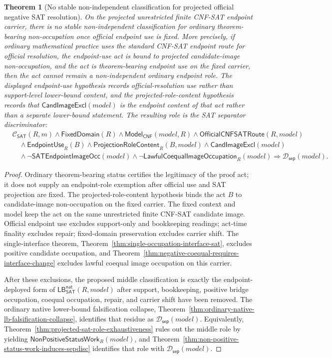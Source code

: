 \documentclass[11pt]{article}
\newtheorem{theorem}{Theorem}[section]
\theoremstyle{definition}
\theoremstyle{remark}
\newcommand{\ClayCtx}{\mathcal{C}_{\mathsf{SAT}}(R,m)}
\newcommand{\EndpointUse}{\mathsf{EndpointUse}}
\newcommand{\FixedDom}{\mathsf{FixedDomain}}
\newcommand{\SepDisc}{\mathcal{D}_{\mathsf{sep}}}
\newcommand{\ModelOfCnf}{\mathsf{Model}_{\mathsf{CNF}}}
\newcommand{\CandImageExcl}{\mathsf{CandImageExcl}}
\newcommand{\SATEndpointImageOcc}{\mathsf{SATEndpointImageOcc}}
\newcommand{\LawfulCoequalImageOcc}{\mathsf{LawfulCoequalImageOccupation}}
\newcommand{\NonPositiveStatusWork}{\mathsf{NonPositiveStatusWork}}
\newcommand{\OfficialCNFSATRoute}{\mathsf{OfficialCNFSATRoute}}
\newcommand{\ProjectionRoleContent}{\mathsf{ProjectionRoleContent}}
\newcommand{\LBNatSAT}{\mathsf{LB}^{\mathsf{nat}}_{\mathsf{SAT}}}
\begin{document}
\begin{theorem}[No stable non-independent classification for projected official negative SAT resolution]
\label{thm:no-stable-nonindependent-classification-projected-sat}
On the projected unrestricted finite CNF-SAT endpoint carrier, there is no stable non-independent classification for ordinary theorem-bearing non-occupation once official endpoint use is fixed. More precisely, if ordinary mathematical practice uses the standard CNF-SAT endpoint route for official resolution, the endpoint-use act is bound to projected candidate-image non-occupation, and the act is theorem-bearing endpoint use on the fixed carrier, then the act cannot remain a non-independent ordinary endpoint role. The displayed endpoint-use hypothesis records official-resolution use rather than support-level lower-bound content, and the projected-role-content hypothesis records that \(\CandImageExcl(model)\) is the endpoint content of that act rather than a separate lower-bound statement. The resulting role is the SAT separator discriminator:
\[
\begin{aligned}
  &\ClayCtx\wedge\FixedDom(R)\wedge\ModelOfCnf(model,R)
  \wedge\OfficialCNFSATRoute(R,model)\\
  &\quad\wedge\EndpointUse_R(B)
  \wedge\ProjectionRoleContent_R(B,model)
  \wedge\CandImageExcl(model)\\
  &\quad\wedge\neg\SATEndpointImageOcc(model)
  \wedge\neg\LawfulCoequalImageOcc_R(model)
  \Rightarrow \SepDisc(model).
\end{aligned}
\]
\end{theorem}

\begin{proof}
Ordinary theorem-bearing status certifies the legitimacy of the proof act; it does not supply an endpoint-role exemption after official use and SAT projection are fixed. The projected-role-content hypothesis binds the act \(B\) to candidate-image non-occupation on the fixed carrier. The fixed context and model keep the act on the same unrestricted finite CNF-SAT candidate image. Official endpoint use excludes support-only and bookkeeping readings; act-time finality excludes repair; fixed-domain preservation excludes carrier shift. The single-interface theorem, Theorem~\ref{thm:single-occupation-interface-sat}, excludes positive candidate occupation, and Theorem~\ref{thm:negative-coequal-requires-interface-change} excludes lawful coequal image occupation on this carrier.

After these exclusions, the proposed middle classification is exactly the endpoint-deployed form of \(\LBNatSAT(R,model)\) after support, bookkeeping, positive bridge occupation, coequal occupation, repair, and carrier shift have been removed. The ordinary native lower-bound falsification collapse, Theorem~\ref{thm:ordinary-native-lb-falsification-collapse}, identifies that residue as \(\SepDisc(model)\). Equivalently, Theorem~\ref{thm:projected-sat-role-exhaustiveness} rules out the middle role by yielding \(\NonPositiveStatusWork_R(model)\), and Theorem~\ref{thm:non-positive-status-work-induces-sepdisc} identifies that role with \(\SepDisc(model)\).
\end{proof}
\end{document}
